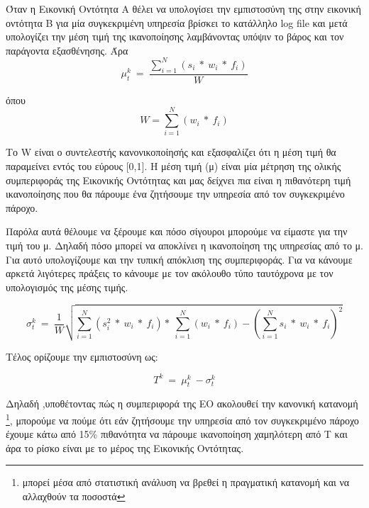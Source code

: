 \newpage
Όταν η Εικονική Οντότητα Α θέλει να υπολογίσει την εμπιστοσύνη της στην εικονική οντότητα Β για μία συγκεκριμένη υπηρεσία βρίσκει το κατάλληλο log file και μετά υπολογίζει την μέση τιμή της ικανοποίησης λαμβάνοντας υπόψιν το βάρος και τον παράγοντα εξασθένησης. Άρα 
\begin{equation}\label{eq:average}
 \mu_t^k\  =\ \frac{\sum_{i=1}^{N}\left(s_i\ *\ w_i\ *\ f_i\right)}{W} 
\end{equation}

όπου 
\begin{equation}\label{eq:weight}
 W = \sum_{i=1}^{N}\left(w_i\ *\ f_i\right)
\end{equation}

Το W είναι ο συντελεστής κανονικοποίησής και εξασφαλίζει ότι η μέση τιμή θα παραμείνει εντός του εύρους [0,1]. Η μέση τιμή (μ) είναι μία μέτρηση της ολικής συμπεριφοράς της Εικονικής Οντότητας και μας δείχνει πια είναι η πιθανότερη τιμή ικανοποίησης που θα πάρουμε ένα ζητήσουμε την υπηρεσία από τον συγκεκριμένο πάροχο.

Παρόλα αυτά θέλουμε να ξέρουμε και πόσο σίγουροι μπορούμε να είμαστε για την τιμή του μ. Δηλαδή πόσο μπορεί να αποκλίνει η ικανοποίηση της υπηρεσίας από το μ. Για αυτό υπολογίζουμε και την τυπική απόκλιση της συμπεριφοράς. Για να κάνουμε αρκετά λιγότερες πράξεις το κάνουμε με τον ακόλουθο τύπο ταυτόχρονα με τον υπολογισμός της μέσης τιμής.

\begin{equation}\label{eq:deviation}
 \sigma_t^k\  =\ \frac{1}{W} \sqrt{\sum_{i=1}^{N}\left(s_i^2\ *\ w_i\ *\ f_i\right)* \ \sum_{i=1}^{N} \left(w_i\ * \ f_i \right)- \left( \sum_{i=1}^{N} s_i\ *\ w_i\ *\ f_i\right)^2}
\end{equation}

Τέλος ορίζουμε την εμπιστοσύνη ως:

\begin{equation}\label{eq:trust}
 T^k \ = \ \mu_t^k \ - \sigma_t^k 
\end{equation}

Δηλαδή ,υποθέτοντας πώς η συμπεριφορά της ΕΟ ακολουθεί την κανονική κατανομή \footnote{μπορεί μέσα από στατιστική ανάλυση να βρεθεί η πραγματική κατανομή και να αλλαχθούν τα ποσοστά}, μπορούμε να πούμε ότι εάν ζητήσουμε την υπηρεσία από τον συγκεκριμένο πάροχο έχουμε κάτω από 15\% πιθανότητα να πάρουμε ικανοποίηση χαμηλότερη από Τ και άρα το ρίσκο είναι με το μέρος της Εικονικής Οντότητας.

